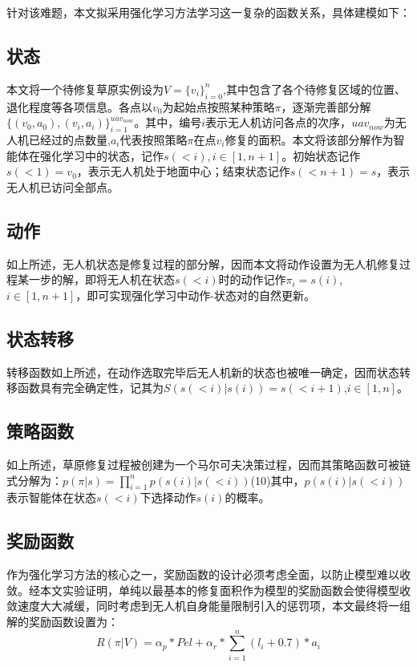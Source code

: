针对该难题，本文拟采用强化学习方法学习这一复杂的函数关系，具体建模如下：

\subsection{状态}

本文将一个待修复草原实例设为$V=\{v_i\}_{i=0}^n$,其中包含了各个待修复区域的位置、退化程度等各项信息。各点以$v_0$为起始点按照某种策略$\pi$，逐渐完善部分解$\{(v_0,a_0),(v_i,a_i)\}_{i=1}^{uav_{now}}$。其中，编号$i$表示无人机访问各点的次序，$uav_{now}$为无人机已经过的点数量,$a_i$代表按照策略$\pi$在点$v_i$修复的面积。本文将该部分解作为智能体在强化学习中的状态，记作$s(<i),i\in[1,n+1]$。初始状态记作$s(<1)=v_0$，表示无人机处于地面中心；结束状态记作$s(<n+1)=s$，表示无人机已访问全部点。

\subsection{动作}

如上所述，无人机状态是修复过程的部分解，因而本文将动作设置为无人机修复过程某一步的解，即将无人机在状态$s(<i)$时的动作记作$\pi_i=s(i)$,$i\in[1,n+1]$，即可实现强化学习中动作-状态对的自然更新。

\subsection{状态转移}

转移函数如上所述，在动作选取完毕后无人机新的状态也被唯一确定，因而状态转移函数具有完全确定性，记其为$S(s(<i)|s(i))=s(<i+1)$,$i\in[1,n]$。

\subsection{策略函数}

如上所述，草原修复过程被创建为一个马尔可夫决策过程，因而其策略函数可被链式分解为：$p(\pi|s)=\prod_{i=1}^n p(s(i)|s(<i))$(10)其中，$p(s(i)|s(<i))$表示智能体在状态$s(<i)$下选择动作$s(i)$的概率。

\subsection{奖励函数}

作为强化学习方法的核心之一，奖励函数的设计必须考虑全面，以防止模型难以收敛。经本文实验证明，单纯以最基本的修复面积作为模型的奖励函数会使得模型收敛速度大大减缓，同时考虑到无人机自身能量限制引入的惩罚项，本文最终将一组解的奖励函数设置为：
\begin{equation}
	R(\pi|V)=\alpha_{p}*Pel+\alpha_{r}*\sum_{i=1}^{n}(l_i+0.7)*a_{i}
	\label{eq:11}
\end{equation}

